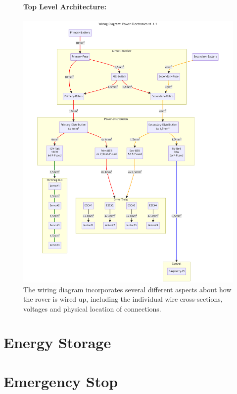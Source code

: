     \begin{figure}[ht!] %
        \paragraph{Top Level Architecture:}
        \centering
        \includegraphics[width=1\textwidth]{contents/figures/wiring-diagram-p-v1.1.1.png}
        \caption{The wiring diagram incorporates several different aspects about how the rover is wired up, including the individual wire cross-sections, voltages and physical location of connections.}
        \label{wiring_diagram}
    \end{figure}

    \clearpage %

\section{Energy Storage}

\section{Emergency Stop}

